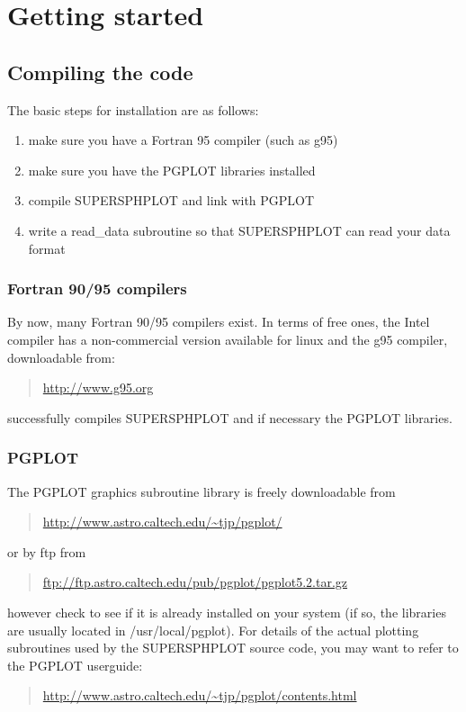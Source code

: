 \documentclass[a4paper,11pt]{article}
\begin{document}
\section{Getting started}
\subsection{Compiling the code}
The basic steps for installation are as follows:
\begin{enumerate}
\item make sure you have a Fortran 95 compiler (such as g95)
\item make sure you have the PGPLOT libraries installed
\item compile SUPERSPHPLOT and link with PGPLOT
\item write a read\_data subroutine so that SUPERSPHPLOT can read your data format
\end{enumerate}

\subsubsection{Fortran 90/95 compilers}
 By now, many Fortran 90/95 compilers exist. In terms of free ones, the Intel compiler has a
 non-commercial version available for linux and the
g95 compiler, downloadable from:
\begin{quote}
\url{http://www.g95.org}
\end{quote}
successfully compiles SUPERSPHPLOT and if necessary the PGPLOT libraries.

\subsubsection{PGPLOT}
 The PGPLOT
graphics subroutine library is freely downloadable from
\begin{quote}
\url{http://www.astro.caltech.edu/~tjp/pgplot/}
\end{quote}
or by ftp from
\begin{quote}
\url{ftp://ftp.astro.caltech.edu/pub/pgplot/pgplot5.2.tar.gz}
\end{quote}
however check to see if it is already installed on your system (if so, the libraries are
usually located in /usr/local/pgplot). For details of the actual plotting subroutines
used by the SUPERSPHPLOT source code, you may want to refer to the PGPLOT userguide:
\begin{quote}
\url{http://www.astro.caltech.edu/~tjp/pgplot/contents.html}
\end{quote}
\end{document}
